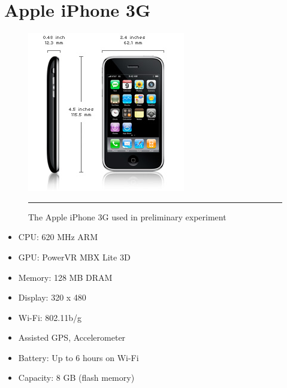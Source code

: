 \chapter{Apple iPhone 3G}
\label{AppendixiPhone}

\begin{figure}[htbp]
  \centering
    \includegraphics{./Primitives/iphone.jpg}
    \rule{35em}{0.5pt}
  \caption[Apple iPhone 3G]{The Apple iPhone 3G used in preliminary experiment}
\end{figure}

\begin{itemize}
	\item CPU: 620 MHz ARM
	\item GPU: PowerVR MBX Lite 3D
	\item Memory: 128 MB DRAM
	\item Display: 320 x 480
	\item Wi-Fi: 802.11b/g
	\item Assisted GPS, Accelerometer
	\item Battery: Up to 6 hours on Wi-Fi
	\item Capacity: 8 GB (flash memory)
\end{itemize}
